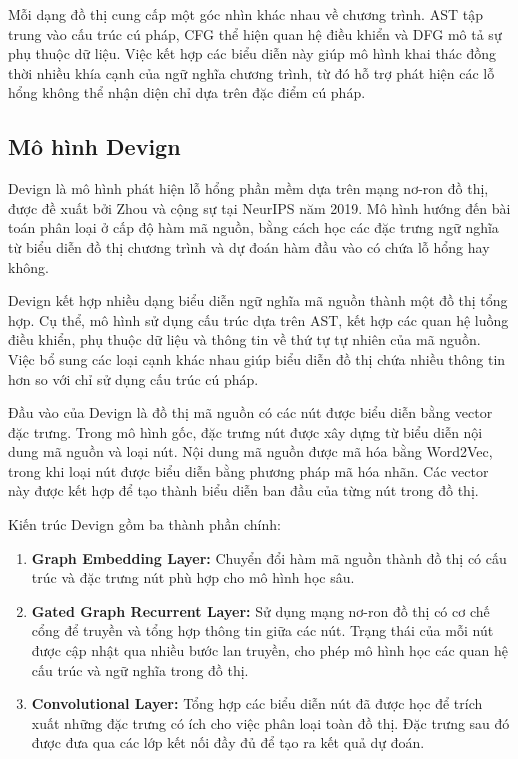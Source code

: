 Mỗi dạng đồ thị cung cấp một góc nhìn khác nhau về chương trình. AST tập trung vào cấu trúc cú
pháp, CFG thể hiện quan hệ điều khiển và DFG mô tả sự phụ thuộc dữ liệu. Việc kết hợp các biểu diễn
này giúp mô hình khai thác đồng thời nhiều khía cạnh của ngữ nghĩa chương trình, từ đó hỗ trợ phát
hiện các lỗ hổng không thể nhận diện chỉ dựa trên đặc điểm cú pháp.

\subsection{Mô hình Devign}

Devign là mô hình phát hiện lỗ hổng phần mềm dựa trên mạng nơ-ron đồ thị, được đề xuất bởi Zhou và
cộng sự tại NeurIPS năm 2019. Mô hình hướng đến bài toán phân loại ở cấp độ hàm mã nguồn, bằng cách
học các đặc trưng ngữ nghĩa từ biểu diễn đồ thị chương trình và dự đoán hàm đầu vào có chứa lỗ hổng
hay không.

Devign kết hợp nhiều dạng biểu diễn ngữ nghĩa mã nguồn thành một đồ thị tổng hợp. Cụ thể, mô hình
sử dụng cấu trúc dựa trên AST, kết hợp các quan hệ luồng điều khiển, phụ thuộc dữ liệu và thông tin
về thứ tự tự nhiên của mã nguồn. Việc bổ sung các loại cạnh khác nhau giúp biểu diễn đồ thị chứa
nhiều thông tin hơn so với chỉ sử dụng cấu trúc cú pháp.

Đầu vào của Devign là đồ thị mã nguồn có các nút được biểu diễn bằng vector đặc trưng. Trong mô hình gốc, đặc trưng nút được xây dựng từ biểu diễn nội dung mã nguồn và loại nút. Nội dung mã nguồn được mã hóa bằng Word2Vec, trong khi loại nút được biểu diễn bằng phương pháp mã hóa nhãn. Các vector này được kết hợp để tạo thành biểu diễn ban đầu của từng nút trong đồ thị.

Kiến trúc Devign gồm ba thành phần chính:

\begin{enumerate}
	\item \textbf{Graph Embedding Layer:} Chuyển đổi hàm mã nguồn thành đồ thị có cấu trúc và đặc trưng nút phù hợp cho mô hình học sâu.
	\item \textbf{Gated Graph Recurrent Layer:} Sử dụng mạng nơ-ron đồ thị có cơ chế cổng để truyền và tổng hợp thông tin giữa các nút. Trạng thái của mỗi nút được cập nhật qua nhiều bước lan truyền, cho phép mô hình học các quan hệ cấu trúc và ngữ nghĩa trong đồ thị.
	\item \textbf{Convolutional Layer:} Tổng hợp các biểu diễn nút đã được học để trích xuất những đặc trưng có ích cho việc phân loại toàn đồ thị. Đặc trưng sau đó được đưa qua các lớp kết nối đầy đủ để tạo ra kết quả dự đoán.
\end{enumerate}

